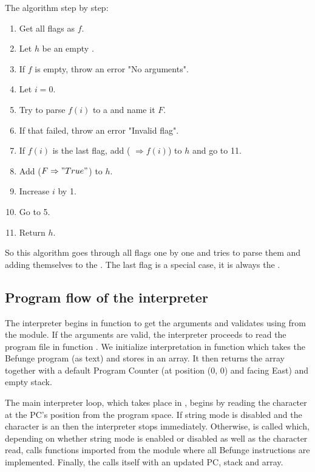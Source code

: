 \documentclass[12pt, a4paper]{article}
\begin{document}
The algorithm step by step:
\begin{enumerate}
\itemsep-0.5em
\item Get all flags as $f$.
\item Let $h$ be an empty .
\item If $f$ is empty, throw an error "No arguments".
\item Let $i = 0$.
\item Try to parse $f(i)$ to a  and name it $F$.
\item If that failed, throw an error "Invalid flag".
\item If $f(i)$ is the last flag, add ( $\Rightarrow f(i)$) to $h$ and go to 11.
\item Add ($F \Rightarrow "True"$) to $h$.
\item Increase $i$ by 1.
\item Go to 5.
\item Return $h$.
\end{enumerate}

So this algorithm goes through all flags one by one and tries to parse them and adding themselves to the . The last flag is a special case, it is always the . 

\subsection{Program flow of the interpreter}
\label{sec:interpreterflow}

The interpreter begins in function  to get the arguments and validates using  from the  module. If the arguments are valid, the interpreter proceeds to read the program file in function . We initialize interpretation in function  which takes the Befunge program (as text) and stores in an array. It then returns the array together with a default Program Counter (at position (0, 0) and facing East) and empty stack.

The main interpreter loop, which takes place in , begins by reading the character at the PC's position from the program space. If string mode is disabled and the character is an  then the interpreter stops immediately. Otherwise,  is called which, depending on whether string mode is enabled or disabled as well as the character read, calls functions imported from the module  where all Befunge instructions are implemented. Finally, the  calls itself with an updated PC, stack and array.
\end{document}
